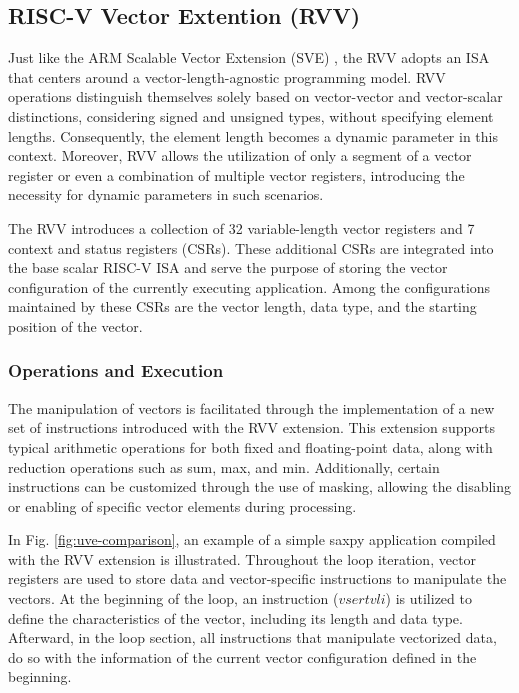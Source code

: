 \subsection{RISC-V Vector Extention (RVV)}
\label{label:rvv}

Just like the ARM Scalable Vector Extension (SVE) \cite{arm-paper}, the \acrfull{RVV} \cite{RVV} adopts an \acrfull{ISA} that centers around a vector-length-agnostic programming model. \acrshort{RVV} operations distinguish themselves solely based on vector-vector and vector-scalar distinctions, considering signed and unsigned types, without specifying element lengths. Consequently, the element length becomes a dynamic parameter in this context. Moreover, \acrshort{RVV} allows the utilization of only a segment of a vector register or even a combination of multiple vector registers, introducing the necessity for dynamic parameters in such scenarios.


The \acrlong{RVV} introduces a collection of 32 variable-length vector registers and 7 context and status registers (CSRs). These additional CSRs are integrated into the base scalar RISC-V ISA and serve the purpose of storing the vector configuration of the currently executing application. Among the configurations maintained by these CSRs are the vector length, data type, and the starting position of the vector.

\subsubsection{Operations and Execution}

The manipulation of vectors is facilitated through the implementation of a new set of instructions introduced with the \acrshort{RVV} extension. This extension supports typical arithmetic operations for both fixed and floating-point data, along with reduction operations such as sum, max, and min. Additionally, certain instructions can be customized through the use of masking, allowing the disabling or enabling of specific vector elements during processing.

In Fig. \ref{fig:uve-comparison}, an example of a simple saxpy application compiled with the RVV extension is illustrated. Throughout the loop iteration, vector registers are used to store data and vector-specific instructions to manipulate the vectors. At the beginning of the loop, an instruction ($vsertvli$) is utilized to define the characteristics of the vector, including its length and data type. Afterward, in the loop section, all instructions that manipulate vectorized data, do so with the information of the current vector configuration defined in the beginning. 





